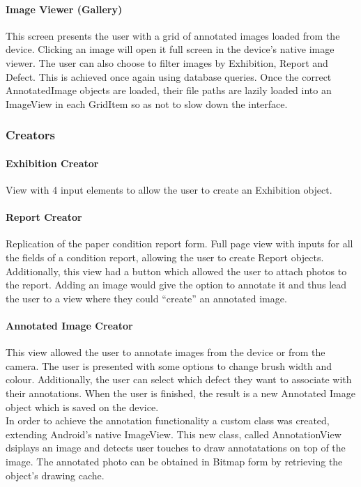 \documentclass[12pt]{article}
\begin{document}
\paragraph{Image Viewer (Gallery)}
This screen presents the user with a grid of annotated images loaded from the device. Clicking an image will open it full screen in the device's native image viewer. The user can also choose to filter images by Exhibition, Report and Defect. This is achieved once again using database queries. Once the correct AnnotatedImage objects are loaded, their file paths are lazily loaded into an ImageView in each GridItem so as not to slow down the interface. 

\subsubsection{Creators}
\label{sec:creators}

\paragraph{Exhibition Creator}
View with 4 input elements to allow the user to create an Exhibition object.

\paragraph{Report Creator}
Replication of the paper condition report form. Full page view with inputs for all the fields of a condition report, allowing the user to create Report objects. Additionally, this view had a button which allowed the user to attach photos to the report. Adding an image would give the option to annotate it and thus lead the user to a view where they could ``create'' an annotated image.

\paragraph{Annotated Image Creator}
This view allowed the user to annotate images from the device or from the camera. The user is presented with some options to change brush width and colour. Additionally, the user can select which defect they want to associate with their annotations. When the user is finished, the result is a new Annotated Image object which is saved on the device. \\

In order to achieve the annotation functionality a custom class was created, extending Android's native ImageView. This new class, called AnnotationView dsiplays an image and detects user touches to draw annotatations on top of the image. The annotated photo can be obtained in Bitmap form by retrieving the object's drawing cache. 
\end{document}
